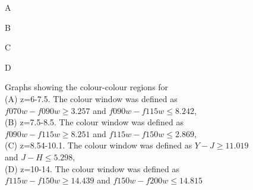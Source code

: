 		\begin{figure}[!htbp]
			\begin{minipage}[c]{0.5\linewidth}
				\centering
					\begingroup{}
						\resizebox{\textwidth}{!}{%
							
						}\endgroup
				\caption{A\label{fig:col1}}
			\end{minipage}
			\begin{minipage}[c]{0.5\linewidth}
				\centering
					\begingroup{}
						\resizebox{\textwidth}{!}{%
							
						}\endgroup
				\caption{B\label{fig:col2}}
			\end{minipage}
			\begin{minipage}[c]{0.5\linewidth}
				\centering
					\begingroup{}
						\resizebox{\textwidth}{!}{%
							
						}\endgroup
				\caption{C\label{fig:col3}}
			\end{minipage}
			\begin{minipage}[c]{0.5\linewidth}
				\centering
					\begingroup{}
						\resizebox{\textwidth}{!}{%
							
						}\endgroup
				\caption{D\label{fig:col4}}
			\end{minipage}
			\caption{Graphs showing the colour-colour regions for \\
			(A) z=6-7.5. The colour window was defined as $f070w-f090w{\ge}3.257$ and $f090w-f115w{\le}8.242$,\\
			(B) z=7.5-8.5. The colour window was defined as $f090w-f115w{\ge}8.251$ and $f115w-f150w{\le}2.869$, \\
			(C) z=8.54-10.1. The colour window was defined as $Y-J{\ge}11.019$ and $J-H{\le}5.298$, \\
			(D) z=10-14. The colour window was defined as $f115w-f150w{\ge}14.439$ and $f150w-f200w{\le}14.815$}
		\end{figure}

